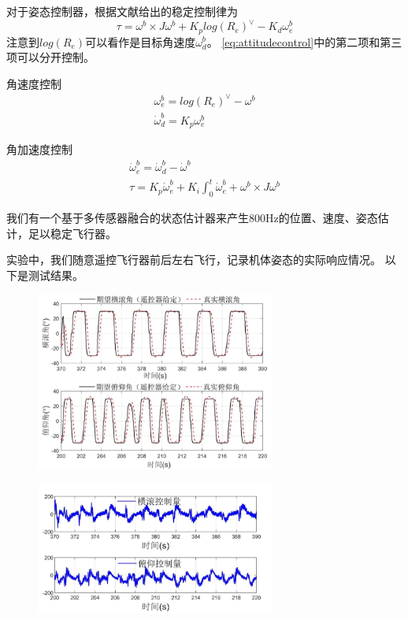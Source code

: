 \documentclass[
  type=master
]{gdutthesis}
\begin{document}
对于姿态控制器，根据文献\cite{yu2015high}给出的稳定控制律为
\begin{equation}\label{eq:attitudecontrol}
	\tau = \omega^b \times J \omega^b + K_p log(R_e)^{\vee} - K_d \omega^b_e
\end{equation}
注意到$log(R_e)$可以看作是目标角速度$\omega^b_d$。
\autoref{eq:attitudecontrol}中的第二项和第三项可以分开控制。

角速度控制
\begin{gather}\label{eq:angularacontrol}
	\omega^b_e = log(R_e)^{\vee} - \omega^b\\
	\dot{\omega}^b_d = K_p \omega^b_e
\end{gather}

角加速度控制
\begin{gather}\label{eq:angularaccelerationcontrol}
		\dot{\omega}^b_e = \dot{\omega}^b_d - \dot{\omega}^b\\
		\tau = K_p \dot{\omega}^b_e + K_i \int_{0}^{t}\dot{\omega}^b_e + \omega^b \times J \omega^b
\end{gather}

我们有一个基于多传感器融合的状态估计器来产生800Hz的位置、速度、姿态估计，足以稳定飞行器。

实验中，我们随意遥控飞行器前后左右飞行，记录机体姿态的实际响应情况。
以下是测试结果。

\begin{figure}[htbp]
	\centering
	\includegraphics[width=0.7\textwidth]{屏幕截图 2022-04-06 150427.png}
	\label{fig:Rptrackingresults}
\end{figure}

\begin{figure}[htbp]
	\centering
	\includegraphics[width=0.7\textwidth]{屏幕截图 2022-04-06 151409.png}
	\label{fig:Rpcontroloutput}
\end{figure}
\end{document}
